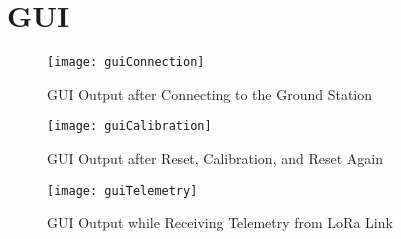 \clearpage
\section{GUI}\label{sec:appendix_gui}
\begin{figure}[!htb]
  \centering
  \texttt{[image: guiConnection]}
  \caption{GUI Output after Connecting to the Ground Station }
  \label{fig:guiConnection}
\end{figure}
\begin{figure}[!htb]
  \centering
  \texttt{[image: guiCalibration]}
  \caption{GUI Output after Reset, Calibration, and Reset Again}
  \label{fig:guiCalibration}
\end{figure}
\begin{figure}[!htb]
  \centering
  \texttt{[image: guiTelemetry]}
  \caption{GUI Output while Receiving Telemetry from LoRa Link}
  \label{fig:guiTelemetry}
\end{figure}